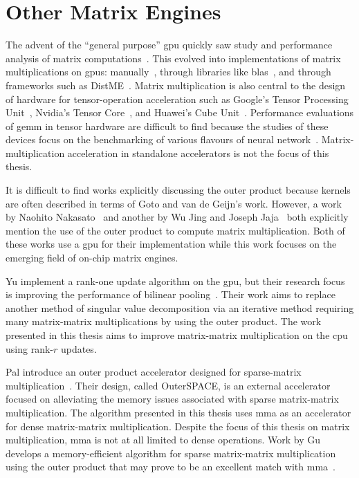 \documentclass[\main/thesis.tex]{subfiles}
\begin{document}
\section{Other Matrix Engines}
The advent of the ``general purpose'' \gls{gpu} quickly saw study and performance analysis of matrix computations~\autocite{larsen2001fast,fatahalian2004understanding}.
This evolved into implementations of matrix multiplications on \glspl{gpu}: manually~\autocite{li2011strassens}, through libraries like \gls{blas}~\autocite{nath2011accelerating}, and through frameworks such as DistME~\autocite{han2019distme}.
Matrix multiplication is also central to the design of hardware for tensor-operation acceleration such as Google's Tensor Processing Unit~\autocite{jouppi2017datacenter}, Nvidia's Tensor Core~\autocite{markidis2018nvidia}, and Huawei's Cube Unit~\autocite{liao2019davinci}.
Performance evaluations of \gls{gemm} in tensor hardware are difficult to find because the studies of these devices focus on the benchmarking of various flavours of neural network~\autocite{jouppi2017datacenter,wang2019benchmarking}.
Matrix-multiplication acceleration in standalone accelerators is not the focus of this thesis.

It is difficult to find works explicitly discussing the outer product because kernels are often described in terms of Goto and van de Geijn's work.
However, a work by Naohito Nakasato~\autocite{nakasato2011fast} and another by Wu Jing and Joseph Jaja~\autocite{wu2016achieving} both explicitly mention the use of the outer product to compute matrix multiplication.
Both of these works use a \gls{gpu} for their implementation while this work focuses on the emerging field of on-chip matrix engines.

Yu \etal implement a rank-one update algorithm on the \gls{gpu}, but their research focus is improving the performance of bilinear pooling~\autocite{yu2020toward}.
Their work aims to replace another method of singular value decomposition via an iterative method requiring many matrix-matrix multiplications by using the outer product.
The work presented in this thesis aims to improve matrix-matrix multiplication on the \gls{cpu} using rank-$r$ updates.

Pal \etal introduce an outer product accelerator designed for sparse-matrix multiplication~\autocite{pal2018outerspace}.
Their design, called OuterSPACE, is an external accelerator focused on alleviating the memory issues associated with sparse matrix-matrix multiplication.
The algorithm presented in this thesis uses \gls{mma} as an accelerator for dense matrix-matrix multiplication.
Despite the focus of this thesis on matrix multiplication, \gls{mma} is not at all limited to dense operations.
Work by Gu \etal develops a memory-efficient algorithm for sparse matrix-matrix multiplication using the outer product that may prove to be an excellent match with \gls{mma}~\autocite{gu2020bandwidth}.
\end{document}
